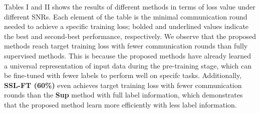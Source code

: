 Tables I and II shows the results of different methods in terms of loss value under different SNRs. Each element of the table is the minimal communication round needed to achieve a specific training loss; bolded and underlined values indicate the best and second-best performance, respectively. We observe that the proposed methods reach target training loss with fewer communication rounds than fully supervised methods. This is because the proposed methods have already learned a universal representation of input data during the pre-training stage, which can be fine-tuned with fewer labels to perform well on specifc tasks. Additionally, \textbf{SSL-FT (60\%)} even achieves target training loss with fewer communication rounds than the \textbf{Sup} method with full label information, which demonstrates that the proposed method learn more efficiently with less label information.







